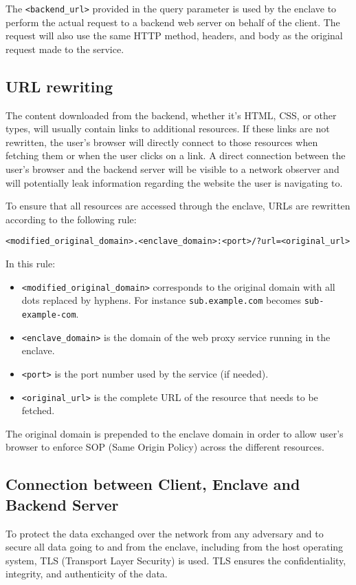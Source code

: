 The \texttt{<backend\_url>} provided in the query parameter is used by the enclave to perform the actual request to a backend web server on behalf of the client. The request will also use the same HTTP method, headers, and body as the original request made to the service.


\subsection{URL rewriting} \label{sec:url-rewriting}
The content downloaded from the backend, whether it's HTML, CSS, or other types, will usually contain links to additional resources. If these links are not rewritten, the user's browser will directly connect to those resources when fetching them or when the user clicks on a link. A direct connection between the user's browser and the backend server will be visible to a network observer and will potentially leak information regarding the website the user is navigating to.

To ensure that all resources are accessed through the enclave, URLs are rewritten according to the following rule:

\texttt{<modified\_original\_domain>.<enclave\_domain>:<port>/?url=<original\_url>}

In this rule:
\begin{itemize}
    \item \texttt{<modified\_original\_domain>} corresponds to the original domain with all dots replaced by hyphens. For instance \texttt{sub.example.com} becomes \texttt{sub-example-com}. 
    \item \texttt{<enclave\_domain>} is the domain of the web proxy service running in the enclave.
    \item \texttt{<port>} is the port number used by the service (if needed).
    \item \texttt{<original\_url>} is the complete URL of the resource that needs to be fetched.
\end{itemize}

The original domain is prepended to the enclave domain in order to allow user's browser to enforce SOP (Same Origin Policy) across the different resources.

\subsection{Connection between Client, Enclave and Backend Server}
To protect the data exchanged over the network from any adversary and to secure all data going to and from the enclave, including from the host operating system, TLS (Transport Layer Security) is used. TLS ensures the confidentiality, integrity, and authenticity of the data.

